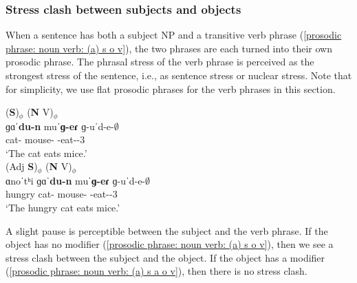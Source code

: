 \subsubsection{Stress clash between subjects and objects}\label{section:intonation:phrase:nounverb:subObj}

When a sentence has both a subject NP and a  transitive verb phrase (\ref{prosodic phrase: noun verb: (a) s o v}), the two phrases are each turned into their own prosodic phrase. The phrasal stress of the verb phrase is perceived as the strongest stress of the sentence, i.e., as sentence stress or nuclear stress. Note that for simplicity,   we use flat prosodic phrases for the verb phrases in this section. 

\begin{exe}
	\ex \label{prosodic phrase: noun verb: (a) s o v} \begin{xlist}
		\ex \glll (\textbf{S})$_\phi$ (\textbf{N} V)$_\phi$ \\
		ɡɑˈ\textbf{du-n} muˈ\textbf{ɡ-eɾ} ɡ-uˈd-e-$\emptyset$ \\
		cat-{} mouse-{\pl} {\ind}-eat-{\thgloss}-3{\sg} \\
		\trans `The cat eats mice.'
		\\ 
		\ex \glll (Adj \textbf{S})$_\phi$ (\textbf{N} V)$_\phi$ \\
		ɑnoˈtʰi ɡɑˈ\textbf{du-n} muˈ\textbf{ɡ-eɾ} ɡ-uˈd-e-$\emptyset$ \\
		hungry cat-{} mouse-{\pl} {\ind}-eat-{\thgloss}-3{\sg} \\
		\trans `The hungry cat eats mice.'
		\\ 
	\end{xlist}
\end{exe}

A slight pause is perceptible between the subject and the verb phrase. If the object has no modifier (\ref{prosodic phrase: noun verb: (a) s o v}), then we see a stress clash between the subject and the object. If the object has a modifier (\ref{prosodic phrase: noun verb: (a) s a o v}), then there is no stress clash. 


